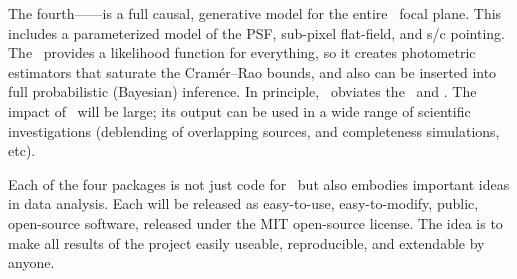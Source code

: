 \documentclass[letterpaper,12pt]{article}
\begin{document}
The fourth---\kpsf---is a full causal, generative model for the entire \Kepler\
focal plane.
This includes a parameterized model of the PSF, sub-pixel flat-field,
and s/c pointing.
The \kpsf\ provides a likelihood function for everything, so it
creates photometric estimators that saturate the Cram\'er--Rao bounds,
and also can
be inserted into full probabilistic (Bayesian) inference.
In principle, \kpsf\ obviates the \PLM\ and \OWL.
The impact of \kpsf\ will be large; its output
can be used in a wide range of
scientific investigations (deblending of overlapping sources,
and completeness simulations, etc).

Each of the four packages is not just code for \Kepler\ but also embodies
important ideas in data analysis.
Each will be released as easy-to-use, easy-to-modify, public, open-source
software, released under the MIT open-source license.
The idea is to make all results of the project easily useable, reproducible, and
extendable by anyone.
\end{document}
